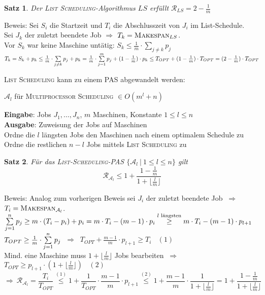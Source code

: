\documentclass[a4paper,10pt]{scrartcl}
\newcommand{\tbf}{\textbf}
\newcommand{\tsc}{\textsc}
\newcommand{\Ra}{\Rightarrow}
\newcommand{\calA}{\mathcal{A}}
\newcommand{\calR}{\mathcal{R}}
\newcommand{\Eingabe}[1]{\STATE \tbf{Eingabe}: #1 \\}
\newcommand{\Ausgabe}[1]{\STATE \tbf{Ausgabe}: #1 \\}
\newtheorem{satz}{Satz}
\begin{document}
\begin{satz}
 Der \tsc{List Scheduling}-Algorithmus $LS$ erfüllt $\calR_{LS} = 2 - \frac{1}{m}$
\end{satz}

Beweis: Sei $S_i$ die Startzeit und $T_i$ die Abschlusszeit von $J_i$ im List-Schedule. \\
Sei $J_k$ der zuletzt beendete Job $\Ra$ $T_k = \tsc{Makespan}_{LS}$. \\
Vor $S_k$ war keine Maschine untätig: $S_k \leq \frac{1}{m} \cdot \sum_{j \not = k} \limits p_j$ \\
$T_k = S_k + p_k \leq \frac{1}{m} \cdot \sum_{j \not = k} \limits p_j + p_k = \frac{1}{m} \cdot \sum_{j = 1}^m \limits p_j + (1 - \frac{1}{m}) \cdot p_k \leq T_{OPT} + (1 - \frac{1}{m}) \cdot T_{OPT} = (2 - \frac{1}{m}) \cdot T_{OPT}$

\tsc{List Scheduling} kann zu einem PAS abgewandelt werden: \\

\begin{algorithm}
\caption{$\calA_l$ für \tsc{Multiprocessor Scheduling} $\in O(m^l + n)$}
\begin{algorithmic}
\Eingabe{Jobs $J_1, \ldots, J_n$, $m$ Maschinen, Konstante $1 \leq l \leq n$}
\Ausgabe{Zuweisung der Jobs auf Maschinen}
\STATE Ordne die $l$ längsten Jobs den Maschinen nach einem optimalem Schedule zu
\STATE Ordne die restlichen $n-l$ Jobs mittels \tsc{List Scheduling} zu
\end{algorithmic}
\end{algorithm}

\begin{satz}
 Für das \tsc{List-Scheduling}-PAS $\{ \calA_l \ | \ 1 \leq l \leq n \}$ gilt $$\calR_{\calA_l} \leq 1 + \frac{1 - \frac{1}{m}}{1 + \lfloor \frac{l}{m} \rfloor}$$
\end{satz}

Beweis: Analog zum vorherigen Beweis sei $J_i$ der zuletzt beendete Job $\ \Ra \ $ $T_i = \tsc{Makespan}_{\calA_l}$. \\
$\sum_{j=1}^n \limits p_j \geq m \cdot (T_i - p_i) + p_i = m \cdot T_i - (m - 1) \cdot p_i \overset{l \text{ längsten}}{\geq} m \cdot T_i - (m - 1) \cdot p_{l+1}$ \\
$T_{OPT} \geq \frac{1}{m} \cdot \sum_{j=1}^n \limits p_j$ $\ \Ra \ $ $T_{OPT} + \frac{m - 1}{m} \cdot p_{l+1} \geq T_i \ \ \ \ (1)$ \\
Mind. eine Maschine muss $1 + \lfloor \frac{l}{m} \rfloor$ Jobs bearbeiten $\ \Ra \ $ $T_{OPT} \geq p_{l+1} \cdot (1 + \lfloor \frac{l}{m} \rfloor) \ \ \ \ (2)$
$$\Ra \ \calR_{\calA_l} = \frac{T_i}{T_{OPT}} \overset{(1)}{\leq} 1 + \frac{1}{T_{OPT}} \cdot \frac{m - 1}{m} \cdot p_{l+1} \overset{(2)}{\leq} 1 + \frac{m - 1}{m} \cdot \frac{1}{1 + \lfloor \frac{l}{m} \rfloor} = 1 + \frac{1 - \frac{1}{m}}{1 + \lfloor \frac{l}{m} \rfloor}$$
\end{document}
